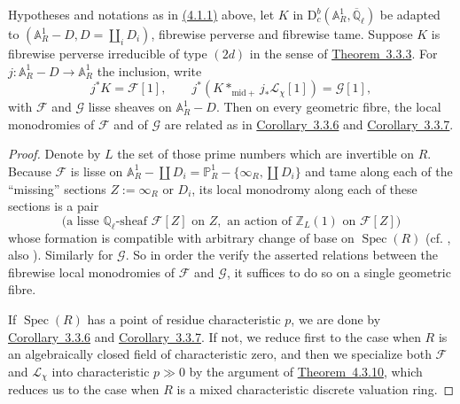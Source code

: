 Hypotheses and notations as in \hyperref[par:4.1.1]{(4.1.1)} above, let \(K\)
in \(\mathrm{D}^b_c(\mathbb{A}^1_R,\overline{\mathbb{Q}}_\ell)\) be adapted to
\((\mathbb{A}^1_R-D,D=\coprod_iD_i)\), fibrewise perverse and fibrewise tame.
Suppose \(K\) is fibrewise perverse irreducible of type \((2d)\) in the sense
of \hyperref[thm:3.3.3]{Theorem~3.3.3}. For
\(j:\mathbb{A}^1_R-D\to\mathbb{A}^1_R\) the inclusion, write
\[
  j^*K=\mathcal{F}[1],
  \qquad
  j^*(K*_{\mathrm{mid}+}j_*\mathcal{L}_\chi[1])=\mathcal{G}[1],
\]
with \(\mathcal{F}\) and \(\mathcal{G}\) lisse sheaves on
\(\mathbb{A}^1_R-D\). Then on every geometric fibre, the local monodromies of
\(\mathcal{F}\) and of \(\mathcal{G}\) are related as in
\hyperref[cor:3.3.6]{Corollary~3.3.6} and
\hyperref[cor:3.3.7]{Corollary~3.3.7}.

\begin{proof}
Denote by \(L\) the set of those prime numbers which are invertible on \(R\).
Because \(\mathcal{F}\) is lisse on
\(\mathbb{A}^1_R-\coprod D_i=\mathbb{P}^1_R-\{\infty_R,\coprod D_i\}\) and
tame along each of the ``missing'' sections \(Z:=\infty_R\) or \(D_i\), its
local monodromy along each of these sections is a pair
\[
  \bigl(
  \text{a lisse }\mathbb{Q}_\ell\text{-sheaf }\mathcal{F}[Z]\text{ on }Z,
  \text{ an action of }\mathbb{Z}_L(1)\text{ on }\mathcal{F}[Z]
  \bigr)
\]
whose formation is compatible with arbitrary change of base on
\(\operatorname{Spec}(R)\) (cf. \cite[1.7.8]{De-WeilII}, also
\cite[4.7.2]{Ka-SE}). Similarly for \(\mathcal{G}\). So in order the verify
the asserted relations between the fibrewise local monodromies of
\(\mathcal{F}\) and \(\mathcal{G}\), it suffices to do so on a single
geometric fibre.

If \(\operatorname{Spec}(R)\) has a point of residue characteristic \(p\), we
are done by \hyperref[cor:3.3.6]{Corollary~3.3.6} and
\hyperref[cor:3.3.7]{Corollary~3.3.7}. If not, we reduce first to the case when
\(R\) is an algebraically closed field of characteristic zero, and then we
specialize both \(\mathcal{F}\) and \(\mathcal{L}_\chi\) into characteristic
\(p\gg0\) by the argument of \hyperref[thm:4.3.10]{Theorem~4.3.10}, which reduces us to the case
when \(R\) is a mixed characteristic discrete valuation ring.
\end{proof}

